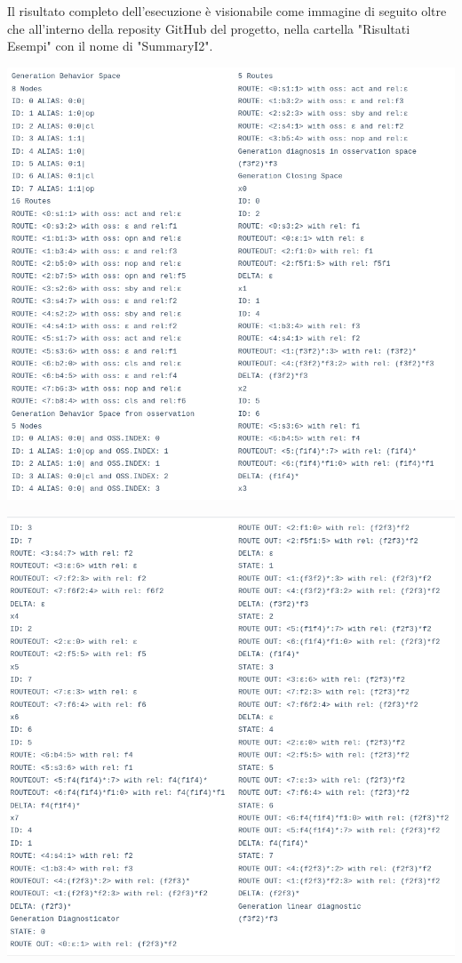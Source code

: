 Il risultato completo dell'esecuzione è visionabile come immagine di seguito oltre che all'interno della reposity GitHub del progetto, nella cartella "Risultati Esempi" con il nome di "SummaryI2".

\includegraphics[width=\textwidth]{immagini/t1_1.png}

\includegraphics[width=\textwidth]{immagini/t1_2.png}

